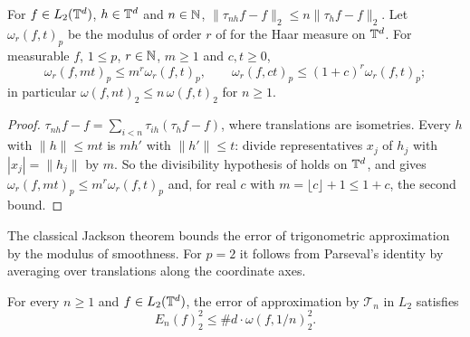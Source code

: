 \begin{lemma}
\label{lem:modulus-linear}
\leanok
{}
For $f \in L_2(\mathbb{T}^d)$, $h \in \mathbb{T}^d$ and $n \in \mathbb{N}$,
$\|\tau_{n h} f - f\|_2 \leq n \|\tau_h f - f\|_2$. Let $\omega_r(f, t)_p$ be the modulus of
order $r$ of  for the Haar measure on $\mathbb{T}^d$. For measurable $f$,
$1 \leq p$, $r \in \mathbb{N}$, $m \geq 1$ and $c, t \geq 0$,
\[
  \omega_r(f, m t)_p \leq m^r \omega_r(f, t)_p , \qquad
  \omega_r(f, c t)_p \leq (1 + c)^r \omega_r(f, t)_p ;
\]
in particular $\omega(f, n t)_2 \leq n \, \omega(f, t)_2$ for $n \geq 1$.
\end{lemma}

\begin{proof}
\leanok
$\tau_{n h} f - f = \sum_{i < n} \tau_{i h} (\tau_h f - f)$, where translations are isometries.
Every $h$ with $\|h\| \leq m t$ is $m h'$ with $\|h'\| \leq t$: divide representatives $x_j$ of
$h_j$ with $|x_j| = \|h_j\|$ by $m$. So the divisibility hypothesis of 
holds on $\mathbb{T}^d$, and  gives
$\omega_r(f, m t)_p \leq m^r \omega_r(f, t)_p$ and, for real $c$ with
$m = \lfloor c \rfloor + 1 \leq 1 + c$, the second bound.
\end{proof}

The classical Jackson theorem bounds the error of trigonometric approximation by the modulus
of smoothness. For $p = 2$ it follows from Parseval's identity by averaging over
translations along the coordinate axes.

\begin{theorem}
\label{thm:torus-jackson}
\leanok
{}
For every $n \geq 1$ and $f \in L_2(\mathbb{T}^d)$, the error of approximation by $\mathcal{T}_n$ in
$L_2$ satisfies
\[
  E_n(f)_2^2 \leq \#d \cdot \omega(f, 1/n)_2^2 .
\]
\end{theorem}

